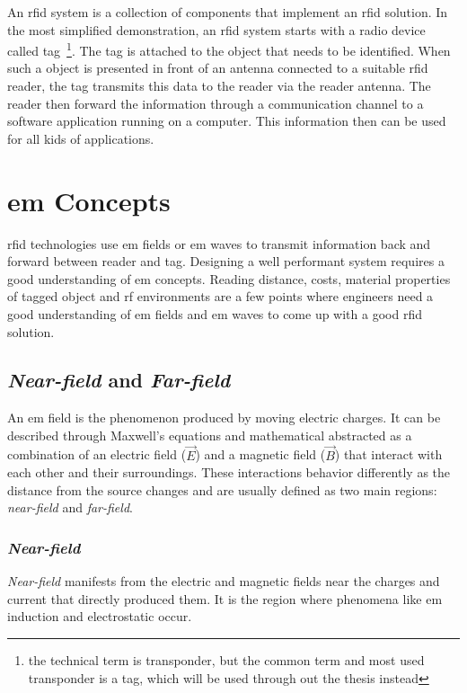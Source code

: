 An \ac{rfid} system is a collection of components that implement an \ac{rfid} solution. In the most simplified demonstration, an \ac{rfid} system starts with a radio device called tag~\footnote{the technical term is transponder, but the common term and most used transponder is a tag, which will be used through out the thesis instead}. The tag is attached to the object that needs to be identified. When such a object is presented in front of an antenna connected to a suitable \ac{rfid} reader, the tag transmits this data to the reader via the reader antenna. The reader then forward the information through a communication channel to a software application running on a computer. This information then can be used for all kids of applications.

\section{\acl{em} Concepts}

\ac{rfid} technologies use \ac{em} fields or \ac{em} waves to transmit information back and forward between reader and tag.
Designing a well performant system requires a good understanding of \ac{em} concepts.
Reading distance, costs, material properties of tagged object and \ac{rf} environments are a few points where engineers need a good understanding of \ac{em} fields and \ac{em} waves to come up with a good \ac{rfid} solution.

\subsection{\emph{Near-field} and \emph{Far-field}}

An \ac{em} field is the phenomenon produced by moving electric charges. It can be described through Maxwell's equations and mathematical abstracted as a combination of an electric field ($\vec{E}$) and a magnetic field ($\vec{B}$) that interact with each other and their surroundings.
These interactions behavior differently as the distance from the source changes and are usually defined as two main regions: \emph{near-field} and \emph{far-field}.

\subsubsection{\emph{Near-field}}

\emph{Near-field} manifests from the electric and magnetic fields near the charges and current that directly produced them. It is the region where phenomena like \ac{em} induction and electrostatic occur.

